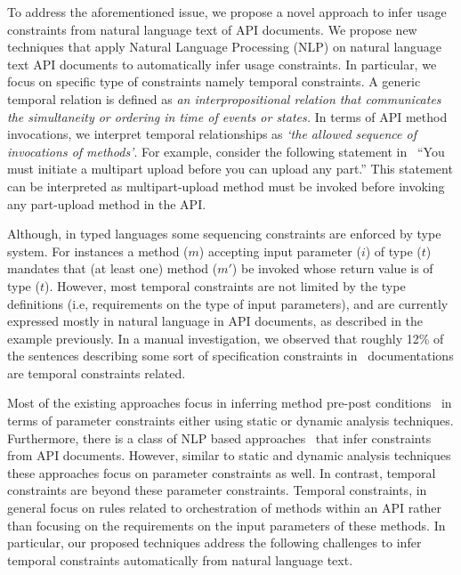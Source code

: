 To address the aforementioned issue, we propose a novel approach to infer usage constraints from natural language text of API documents.
We propose new techniques that apply Natural Language Processing (NLP) on natural language text API documents to automatically infer usage constraints.
In particular, we focus on specific type of constraints namely temporal constraints.
A generic temporal relation is defined as \textit{an interpropositional relation that communicates the simultaneity or ordering in time of events or states.}
In terms of API method invocations, we interpret temporal relationships as \textit{`the allowed sequence of invocations of methods'}.
For example, consider the following statement in \amazonAPI\ ``You must initiate a multipart upload before you can upload any part.''
This statement can be interpreted as multipart-upload method must be invoked before invoking any part-upload method in the API.

Although, in typed languages some sequencing constraints are enforced by type system. 
For instances a method ($m$) accepting input parameter ($i$) of type ($t$) mandates that (at least one) method ($m'$) be invoked whose return value is of type ($t$).  
However, most temporal constraints are not limited by the type definitions (i.e, requirements on the type of input parameters),
and are currently expressed mostly in natural language in API documents, as described in the example previously.
In a manual investigation, we observed that roughly 12\% of the sentences describing some sort of specification constraints in \amazonAPI\ documentations are temporal constraints related.

Most of the existing approaches focus in inferring method pre-post conditions~\cite{Henkel07discoveringdocumentation,Ghezzi:2009:SIB:1555001.1555057,Henkel:2008:DDA:1363102.1363105,Flanagan:2001:HAA:647540.730008,Buse:2008:ADI:1390630.1390664} in terms of parameter constraints either using static or dynamic analysis techniques.
Furthermore, there is a class of NLP based approaches~\cite{pandita12:inferring, wu2013inferring} that infer constraints from API documents.
However, similar to static and dynamic analysis techniques these approaches focus on parameter constraints as well.  
In contrast, temporal constraints are beyond these parameter constraints.
Temporal constraints, in general focus on rules related to orchestration of methods within an API rather than focusing on the requirements on the input parameters of these methods.   
In particular, our proposed techniques address the following challenges to infer temporal constraints automatically from natural language text.


